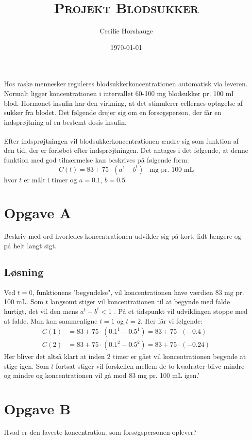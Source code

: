 \documentclass[a4paper, 11pt]{article}
\title{{\large \textsc{Projekt Blodsukker}}}
\author{Cecilie Horshauge}
\date{\today}
\begin{document}
\maketitle
\noindent Hos raske mennesker reguleres blodsukkerkoncentrationen automatisk via leveren. 
Normalt ligger koncentrationen i intervallet 60-100 mg blodsukker pr. 100 ml blod. 
Hormonet insulin har den virkning, at det stimulerer cellernes optagelse af sukker fra blodet. 
Det følgende drejer sig om en forsøgsperson, der får en indsprøjtning af en bestemt dosis insulin.\\\\
Efter indsprøjtningen vil blodsukkerkoncentrationen ændre sig som funktion af den tid,
der er forløbet efter indsprøjtningen. Det antages i det følgende, at denne funktion med god tilnærmelse kan beskrives på følgende form: 
\[C(t)=83+75\cdot (a^t-b^t) \;\;\; \text{mg pr. 100 mL}\]
hvor \(t\) er målt i timer og \(a=0.1\), \(b=0.5\)

\section*{Opgave A} 
Beskriv med ord hvorledes koncentrationen udvikler sig på kort, lidt længere og på helt langt sigt.

\subsection*{Løsning}
Ved \(t=0\), funktionens "begyndelse", vil koncentrationen have værdien \(83\) mg pr. 100 mL. Som \(t\) langsomt stiger vil koncentrationen til at begynde med falde hurtigt, det vil den mens \(a^t-b^t < 1\) . På et tidspunkt vil udviklingen stoppe med at falde. Man kan sammenligne \(t=1\) og \(t=2\). Her får vi følgende:
\begin{align*}
    C(1)&=83+75 \cdot (0.1^1-0.5^1)=83+75 \cdot (-0.4)\\
    C(2)&=83+75 \cdot (0.1^2-0.5^2)=83+75 \cdot (-0.24)
\end{align*} 
Her bliver det altså klart at inden 2 timer er gået vil koncentrationen begynde at stige igen. Som \(t\) fortsat stiger vil forskellen mellem de to kvadrater blive mindre og mindre og koncentrationen vil gå mod 83 mg pr. 100 mL igen.'
\clearpage
\section*{Opgave B} 
Hvad er den laveste koncentration, som forsøgspersonen oplever?
\end{document}
